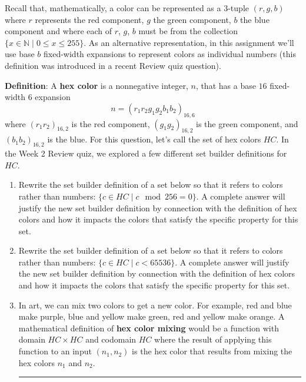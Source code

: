 \documentclass[12pt, oneside]{article}
\begin{document}
\begin{enumerate}[labelindent=0pt, leftmargin=0pt]
Recall that, mathematically, a color can be represented as a $3$-tuple $(r, g, b)$ 
where $r$ represents the red component, $g$ the green component, $b$ the blue component and where each of $r$, $g$, $b$ must be from the collection $\{x \in \mathbb{N}\mid 0 \leq x \leq 255 \}$.
As an alternative representation, in this assignment
we'll use base $b$ fixed-width expansions to represent colors
as individual numbers (this definition was introduced in a recent Review quiz question).

{\bf Definition}: A {\bf hex color} is a nonnegative
integer, $n$, that has a base $16$ fixed-width $6$  expansion
$$n = (r_1r_2g_1g_2b_1b_2)_{16,6}$$ 
where $(r_1r_2)_{16,2}$ is the red
component, $(g_1g_2)_{16,2}$ is the green component, 
and $(b_1b_2)_{16,2}$ is the
blue. 
For this question, let's call the set of hex colors $HC$. In the Week 2 Review quiz, 
we explored a few different set builder definitions for $HC$.

\begin{enumerate}
\item Rewrite the set builder definition of a set below so that it 
refers to colors rather than numbers: $\{ c \in HC \mid c \mod 256 = 0\}$. A complete answer will 
justify the new set builder definition by connection with the definition of hex colors and how it impacts
the colors that satisfy the specific property for this set.
\item Rewrite the set builder definition of a set below so that it 
refers to colors rather than numbers: $\{ c \in HC \mid c < 65536\}$. A complete answer will 
justify the new set builder definition by connection with the definition of hex colors and how it impacts
the colors that satisfy the specific property for this set.
\item  In art, we can mix two colors to get a new color. For example, red and blue make 
purple, blue and yellow make green, red and yellow make orange. 
A mathematical definition of {\bf hex color mixing} would be a function with domain $HC \times HC$
and codomain $HC$ where the result of applying this function to an input $(n_1, n_2)$ is the hex color
that results from mixing the hex colors $n_1$ and $n_2$.


\rule{0.5\textwidth}{.4pt}


\end{enumerate}
\end{enumerate}
\end{document}
